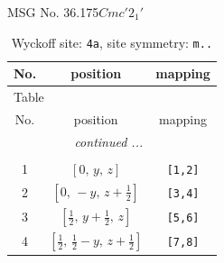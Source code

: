 \documentclass[fleqn,8pt]{jsarticle}
\begin{document}
\setcounter{MaxMatrixCols}{32}

\renewcommand{\tablename}{Table~}
\renewcommand{\figurename}{Figure~}
\begin{center}
\LARGE
MSG No. 36.175\quad$Cmc'2_{1}'$
\end{center}
\renewcommand{\arraystretch}{1.2}
\begin{longtable}{ccc}
\caption{Wyckoff site: {\tt 4a}, site symmetry: {\tt m..}}
 \\
 \hline \hline
No. & position & mapping \\ \hline \endfirsthead

\multicolumn{2}{l}{\tablename\ \thetable{}} \\
 \hline \hline
No. & position & mapping \\ \hline \endhead

 \hline \hline
\multicolumn{2}{r}{\footnotesize\it continued ...} \\ \endfoot

 \hline \hline
\multicolumn{2}{r}{} \\ \endlastfoot

1 & $\left[ 0,\, y,\, z \right]$ & {\tt [1,2]} \\ \hline
2 & $\left[ 0,\, - y,\, z + \frac{1}{2} \right]$ & {\tt [3,4]} \\ \hline
3 & $\left[ \frac{1}{2},\, y + \frac{1}{2},\, z \right]$ & {\tt [5,6]} \\ \hline
4 & $\left[ \frac{1}{2},\, \frac{1}{2} - y,\, z + \frac{1}{2} \right]$ & {\tt [7,8]} \\
\end{longtable}
\renewcommand{\arraystretch}{1.2}
\end{document}
